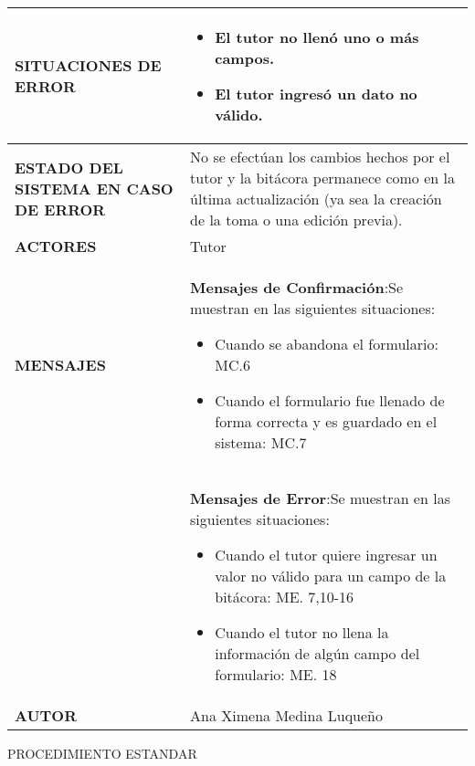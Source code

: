 \begin{longtable}{ | p{6cm} | p{10cm} |}
      \hline
      \textbf{SITUACIONES DE ERROR} & \begin{itemize} \item El tutor no llenó uno o más campos.
\item El tutor ingresó un dato no válido. \end{itemize}\\
      \hline
      \textbf{ESTADO DEL SISTEMA EN CASO DE ERROR} & No se efectúan los cambios hechos por el tutor y la bitácora permanece como en la última actualización (ya sea la creación de la toma o una edición previa).\\
      \hline
      \textbf{ACTORES} & Tutor\\
      \hline
      \textbf{MENSAJES} & \textbf{Mensajes de Confirmación}:\newline Se muestran en las siguientes situaciones: \begin{itemize} \item Cuando se abandona el formulario: MC.6
    \item Cuando el formulario fue llenado de forma correcta y es guardado en el sistema: MC.7
    \end{itemize}\\  & \textbf{Mensajes de Error}:\newline Se muestran en las siguientes situaciones: \begin{itemize} \item Cuando el tutor quiere ingresar un valor no válido para un campo de la bitácora: ME. 7,10-16
\item Cuando el tutor no llena la información de algún campo del formulario: ME. 18 
    \end{itemize}\\
      \hline
      \textbf{AUTOR} & Ana Ximena Medina Luqueño \\
	  \hline
\end{longtable}
\vspace*{1cm}
\Large{PROCEDIMIENTO ESTANDAR}
\large{}
